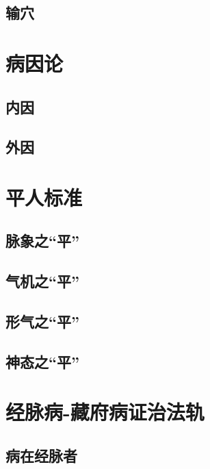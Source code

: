 \documentclass[
]{book}
\begin{document}
\subsection{输穴}\label{ux8f93ux7a74}

\section{病因论}\label{ux75c5ux56e0ux8bba}

\subsection{内因}\label{ux5185ux56e0}

\subsection{外因}\label{ux5916ux56e0}

\section{平人标准}\label{ux5e73ux4ebaux6807ux51c6}

\subsection{脉象之``平''}\label{ux8109ux8c61ux4e4bux5e73}

\subsection{气机之``平''}\label{ux6c14ux673aux4e4bux5e73}

\subsection{形气之``平''}\label{ux5f62ux6c14ux4e4bux5e73}

\subsection{神态之``平''}\label{ux795eux6001ux4e4bux5e73}

\section{经脉病-藏府病证治法轨}\label{ux7ecfux8109ux75c5-ux85cfux5e9cux75c5ux8bc1ux6cbbux6cd5ux8f68}

\subsection{病在经脉者}\label{ux75c5ux5728ux7ecfux8109ux8005}
\end{document}
